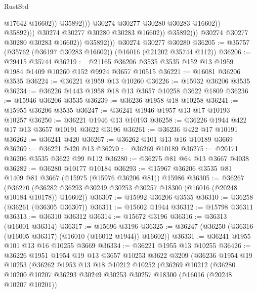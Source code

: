 \begin{lexlean}{RustStd}
\begin{coremodule}
                                            @17642
                                            @16602))
                                        @35892)))
                                  @30274
                                  @30277
                                  @30280
                                  @30283
                                  @16602))
                              @35892)))
                        @30274
                        @30277
                        @30280
                        @30283
                        @16602))
                    @35892)))
              @30274
              @30277
              @30280
              @30283
              @16602))
          @35892)))
    @30274
    @30277
    @30280
@36205 := @35757 (@35762 (@36197 @30283 @16602)) (@16016 (@21202 @35744 @112))
@36206 := @29415 @35744
@36219 := @21165 @36206 @3535 @3535 @152 @13 @1959 @1984 @1409 @10260 @152 @9924 @3657 @10515
@36221 := @16081 @36206 @3535
@36224 := @36221 @1959 @13 @10260
@36226 := @15932 @36206 @3535
@36234 := @36226 @1443 @1958 @18 @13 @3657 @10258 @3622 @1809
@36236 := @15946 @36206 @3535
@36239 := @36236 @1958 @18 @10258
@36241 := @15955 @36206 @3535
@36247 := @36241 @1946 @1957 @13 @17 @10193 @10257
@36250 := @36221 @1946 @13 @10193
@36258 := @36226 @1944 @422 @17 @13 @3657 @10191 @3622 @3196
@36261 := @36236 @422 @17 @10191
@36262 := @36241 @420
@36267 := @36262 @101 @13 @16 @10189 @3669
@36269 := @36221 @420 @13
@36270 := @36269 @10189
@36275 := @20171 @36206 @3535 @3622 @99 @112
@36280 := @36275 @81 @64 @13 @3667 @4038
@36282 := @36280 @10177 @10184
@36293 := @15967 @36206 @3535 @81 @1409 @81 @3667 (@15975 (@15976 @36206 @81)) @15986
@36305 := @36267
    (@36270 (@36282 @36293 @30249 @30253 @30257 @18300 (@16016 (@20248 @10184 @10178)) @16602))
@36307 := @15992 @36206 @3535
@36310 := @36258 (@36261 (@36305 @36307))
@36311 := @15602 @1944
@36312 := @15798 @36311
@36313 := @36310 @36312
@36314 := @15672 @3196
@36316 := @36313 (@16001 @36314)
@36317 := @15696 @3196
@36325 := @36247 (@36250 (@36316 (@16005 @36317) (@16010 (@16012 @1944)) @16602))
@36331 := @36241 @1955 @101 @13 @16 @10255 @3669
@36334 := @36221 @1955 @13 @10255
@36426 := @36226
    @1951
    @1954
    @19
    @13
    @3657
    @10253
    @3622
    @3209
    (@36236
      @1954
      @19
      @10253
      (@36262
        @1953
        @13
        @18
        @10212
        @10252
        (@36269
          @10212
          (@36280
            @10200
            @10207
            @36293
            @30249
            @30253
            @30257
            @18300
            (@16016 (@20248 @10207 @10201))

\end{coremodule}
\end{lexlean}
